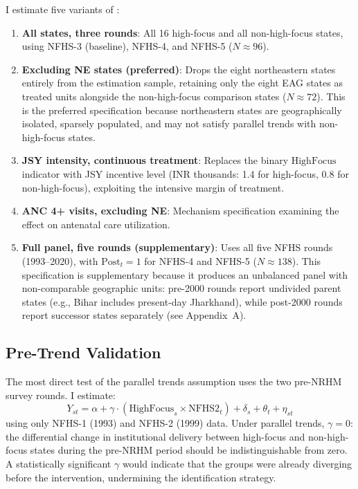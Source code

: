 \documentclass[12pt]{article}
\begin{document}
I estimate five variants of :
\begin{enumerate}
    \item \textbf{All states, three rounds}: All 16 high-focus and all non-high-focus states, using NFHS-3 (baseline), NFHS-4, and NFHS-5 ($N \approx 96$).
    \item \textbf{Excluding NE states (preferred)}: Drops the eight northeastern states entirely from the estimation sample, retaining only the eight EAG states as treated units alongside the non-high-focus comparison states ($N \approx 72$). This is the preferred specification because northeastern states are geographically isolated, sparsely populated, and may not satisfy parallel trends with non-high-focus states.
    \item \textbf{JSY intensity, continuous treatment}: Replaces the binary $\text{HighFocus}$ indicator with JSY incentive level (INR thousands: 1.4 for high-focus, 0.8 for non-high-focus), exploiting the intensive margin of treatment.
    \item \textbf{ANC 4+ visits, excluding NE}: Mechanism specification examining the effect on antenatal care utilization.
    \item \textbf{Full panel, five rounds (supplementary)}: Uses all five NFHS rounds (1993--2020), with $\text{Post}_t = 1$ for NFHS-4 and NFHS-5 ($N \approx 138$). This specification is supplementary because it produces an unbalanced panel with non-comparable geographic units: pre-2000 rounds report undivided parent states (e.g., Bihar includes present-day Jharkhand), while post-2000 rounds report successor states separately (see Appendix~A).
\end{enumerate}

\subsection{Pre-Trend Validation}

The most direct test of the parallel trends assumption uses the two pre-NRHM survey rounds. I estimate:
\begin{equation}
Y_{st} = \alpha + \gamma \cdot (\text{HighFocus}_s \times \text{NFHS2}_t) + \delta_s + \theta_t + \eta_{st}
\label{eq:pretrend}
\end{equation}
using only NFHS-1 (1993) and NFHS-2 (1999) data. Under parallel trends, $\gamma = 0$: the differential change in institutional delivery between high-focus and non-high-focus states during the pre-NRHM period should be indistinguishable from zero. A statistically significant $\gamma$ would indicate that the groups were already diverging before the intervention, undermining the identification strategy.
\end{document}
